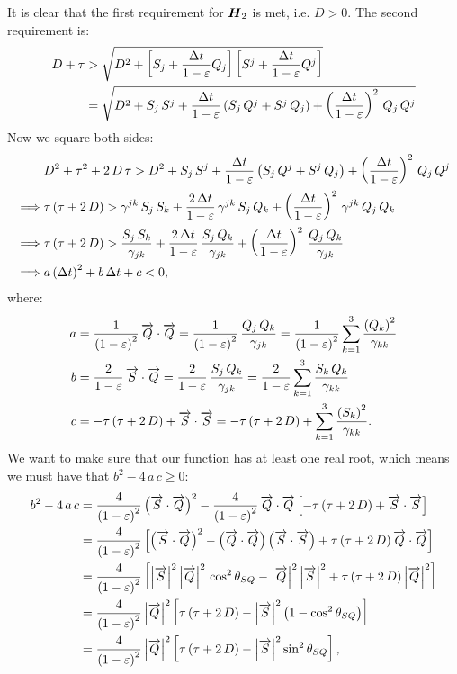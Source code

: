 \documentclass[10pt,preprint]{aastex}
\begin{document}
It is clear that the first requirement for $\boldsymbol{H}_{2}$ is met, i.e. $D>0$. The second requirement is:
\begin{align}
    D+\tau&>\sqrt{D^{2}+\left[S_{j}+\frac{\Delta t}{1-\varepsilon}Q_{j}\right] \left[S^{j}+\frac{\Delta t}{1-\varepsilon}Q^{j}\right]}\\
    &=\sqrt{D^{2}+S_{j}\,S^{j}+\frac{\Delta t}{1-\varepsilon}\left(S_{j}\,Q^{j}+S^{j}\,Q_{j}\right)+\left(\frac{\Delta t}{1-\varepsilon}\right)^{2}\,Q_{j}\,Q^{j}}
\end{align}
Now we square both sides:
\begin{align}
    &D^{2}+\tau^{2}+2\,D\,\tau>D^{2}+S_{j}\,S^{j}+\frac{\Delta t}{1-\varepsilon}\left(S_{j}\,Q^{j}+S^{j}\,Q_{j}\right)+\left(\frac{\Delta t}{1-\varepsilon}\right)^{2}\,Q_{j}\,Q^{j}\\
    \implies&\tau\left(\tau+2\,D\right)>\gamma^{jk}\,S_{j}\,S_{k}+\frac{2\,\Delta t}{1-\varepsilon}\,\gamma^{jk}\,S_{j}\,Q_{k}+\left(\frac{\Delta t}{1-\varepsilon}\right)^{2}\,\gamma^{jk}\,Q_{j}\,Q_{k}\\
    \implies&\tau\left(\tau+2\,D\right)>\frac{S_{j}\,S_{k}}{\gamma_{jk}}+\frac{2\,\Delta t}{1-\varepsilon}\,\frac{S_{j}\,Q_{k}}{\gamma_{jk}}+\left(\frac{\Delta t}{1-\varepsilon}\right)^{2}\,\frac{Q_{j}\,Q_{k}}{\gamma_{jk}}\\
    \implies&a\left(\Delta t\right)^{2}+b\,\Delta t+c<0,
\end{align}
where:
\begin{align}
    a&=\frac{1}{\left(1-\varepsilon\right)^{2}}\,\overrightarrow{Q}\cdot\overrightarrow{Q}=\frac{1}{\left(1-\varepsilon\right)^{2}}\,\frac{Q_{j}\,Q_{k}}{\gamma_{jk}}=\frac{1}{\left(1-\varepsilon\right)^{2}}\sum\limits_{k=1}^{3}\frac{\left(Q_{k}\right)^{2}}{\gamma_{kk}}\\
    b&=\frac{2}{1-\varepsilon}\,\overrightarrow{S}\cdot\overrightarrow{Q}=\frac{2}{1-\varepsilon}\,\frac{S_{j}\,Q_{k}}{\gamma_{jk}}=\frac{2}{1-\varepsilon}\sum\limits_{k=1}^{3}\frac{S_{k}\,Q_{k}}{\gamma_{kk}}\\
    c&=-\tau\left(\tau+2\,D\right)+\overrightarrow{S}\cdot\overrightarrow{S}=-\tau\left(\tau+2\,D\right)+\sum\limits_{k=1}^{3}\frac{\left(S_{k}\right)^{2}}{\gamma_{kk}}.
\end{align}
We want to make sure that our function has at least one real root, which means we must have that $b^{2}-4\,a\,c\geq0$:
\begin{align}
    b^{2}-4\,a\,c&=\frac{4}{\left(1-\varepsilon\right)^{2}}\left(\overrightarrow{S}\cdot\overrightarrow{Q}\right)^{2}-\frac{4}{\left(1-\varepsilon\right)^{2}}\,\overrightarrow{Q}\cdot\overrightarrow{Q}\left[-\tau\left(\tau+2\,D\right)+\overrightarrow{S}\cdot\overrightarrow{S}\right]\\
    &=\frac{4}{\left(1-\varepsilon\right)^{2}}\left[\left(\overrightarrow{S}\cdot\overrightarrow{Q}\right)^{2}-\left(\overrightarrow{Q}\cdot\overrightarrow{Q}\right)\left(\overrightarrow{S}\cdot\overrightarrow{S}\right)+\tau\left(\tau+2\,D\right)\overrightarrow{Q}\cdot\overrightarrow{Q}\right]\\
    &=\frac{4}{\left(1-\varepsilon\right)^{2}}\left[\left|\overrightarrow{S}\right|^{2}\left|\overrightarrow{Q}\right|^{2}\,\cos^{2}\theta_{SQ}-\left|\overrightarrow{Q}\right|^{2}\left|\overrightarrow{S}\right|^{2}+\tau\left(\tau+2\,D\right)\left|\overrightarrow{Q}\right|^{2}\right]\\
    &=\frac{4}{\left(1-\varepsilon\right)^{2}}\left|\overrightarrow{Q}\right|^{2}\left[\tau\left(\tau+2\,D\right)-\left|\overrightarrow{S}\right|^{2}\left(1-\cos^{2}\theta_{SQ}\right)\right]\\
    &=\frac{4}{\left(1-\varepsilon\right)^{2}}\left|\overrightarrow{Q}\right|^{2}\left[\tau\left(\tau+2\,D\right)-\left|\overrightarrow{S}\right|^{2}\sin^{2}\theta_{SQ}\right],
\end{align}
\end{document}
